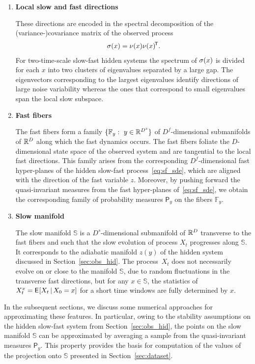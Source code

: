 \documentclass{article}
\newcommand{\ffib}{\mathbb{F}} %
\newcommand{\sman}{\mathbb{S}} %
\newcommand{\invm}{\mathsf{P}} %
\begin{document}
\begin{enumerate}
    \item \textbf{Local slow and fast directions}
    
    These directions are encoded in the spectral decomposition of the (variance-)covariance matrix of the observed process
    \begin{equation}\label{eq:var_cov}
        \si(x) = \nu(x)\tp{\nu(x)}.
    \end{equation}
     For two-time-scale slow-fast hidden systems the spectrum of $\si(x)$ is divided for each $x$ into two clusters of eigenvalues separated by a large gap.
    The eigenvectors corresponding to the largest eigenvalues identify directions of large noise variability whereas the ones that correspond to small eigenvalues span the local slow subspace.
    
    \item \textbf{Fast fibers}
    
    The fast fibers form a family $\{\ffib_y:\ y\in\R^{D^s}\}$ of $D^f$-dimensional submanifolds of $\R^D$ along which the fast dynamics occurs. The fast fibers foliate the $D$-dimensional state space of the observed system and are tangential to the local fast directions. This family arises from the corresponding $D^f$-dimensional fast hyper-planes of the hidden slow-fast process~\eqref{eq:sf_sde}, which are aligned with the direction of the fast variable $z$.
    Moreover, by pushing forward the quasi-invariant measures from the fast hyper-planes of~\eqref{eq:sf_sde}, we obtain the corresponding family of probability measures $\invm_{\!y}$ on the fibers $\ffib_y$.
    
    \item \textbf{Slow manifold}
    
    The slow manifold $\sman$ is a $D^s$-dimensional submanifold of $\R^D$ transverse to the fast fibers and such that the slow evolution of process $X_t$ progresses along $\sman$. It corresponds to the adiabatic manifold $z(y)$ of the hidden system discussed in Section~\ref{sec:obs_hid}. The process~$X_t$ does not necessarily evolve on or close to the manifold $\sman$, due to random fluctuations in the transverse fast directions, but for any $x\in\sman$, the statistics of $X^x_t = \Exp[][X_t\cbar X_0=x]$ for a short time windows are fully determined by $x$.
\end{enumerate}
In the subsequent sections, we discuss some numerical approaches for approximating these features. In particular, owing to the stability assumptions on the hidden slow-fast system from Section~\ref{sec:obs_hid}, the points on the slow manifold $\sman$ can be approximated by averaging a sample from the quasi-invariant measures $\invm_{\!y}$. This property provides the basis for computation of the values of the projection onto $\sman$ presented in Section~\ref{sec:dataset}.
\end{document}
